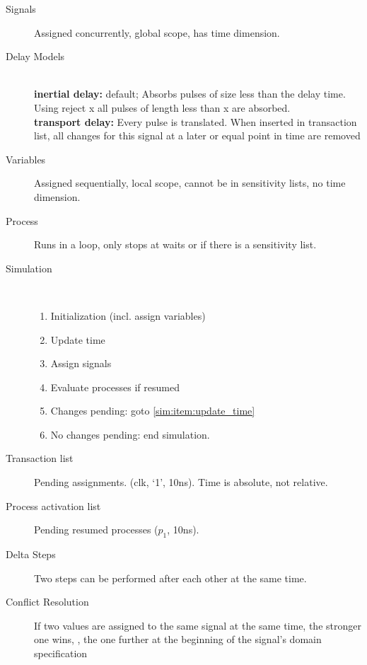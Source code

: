 \begin{description}
	\item[Signals] Assigned concurrently, global scope, has time dimension.
	\item[Delay Models] \ \\
	\textbf{inertial delay:} default; Absorbs pulses of size
	less than the delay time. Using reject x all pulses of length less than x are
	absorbed. \\
	\textbf{transport delay:} Every pulse is translated.
	When inserted in transaction list, all changes for this signal at a later or
	equal point in time are removed
	\item[Variables] Assigned sequentially, local scope, cannot be in sensitivity
	lists, no time dimension.
	\item[Process] Runs in a loop, only stops at waits or if there is a sensitivity
	list.
	\item[Simulation] \ 
	\begin{enumerate}
		\item Initialization (incl. assign variables)
		\item \label{sim:item:update_time}Update time
		\item Assign signals
		\item Evaluate processes if resumed
		\item Changes pending: goto \ref{sim:item:update_time}
		\item No changes pending: end simulation.
	\end{enumerate}
	\item[Transaction list] Pending assignments. 
	(clk, `1', 10ns). Time is absolute, not relative.
	\item[Process activation list] Pending resumed processes ($p_1$, 10ns).
	\item[Delta Steps] Two steps can be performed after each other at the same
	time.
	\item[Conflict Resolution] If two values are assigned to the same signal at the
	same time, the stronger one wins, \ie, the one further at the beginning of the
	signal's domain specification
\end{description}

